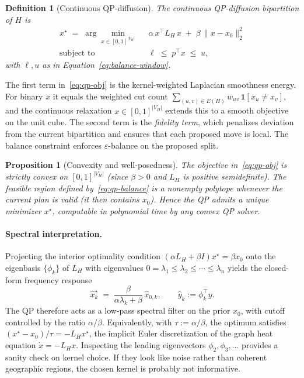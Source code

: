 \documentclass[11pt]{article}
\newtheorem{proposition}{Proposition}[section]
\newtheorem{definition}{Definition}[section]
\begin{document}
\begin{definition}[Continuous QP-diffusion]\label{def:qp}
The continuous QP-diffusion bipartition of $H$ is
\begin{align}
  x^\star \;=\; \arg\min_{x \in [0,1]^{|V_H|}} \;\;
    & \alpha\, x^\top L_H\, x \;+\; \beta\, \|x - x_0\|_2^2 \label{eq:qp-obj} \\
  \text{subject to} \;\;
    & \ell \;\le\; p^\top x \;\le\; u,
    \label{eq:qp-balance}
\end{align}
with $\ell, u$ as in Equation~\eqref{eq:balance-window}.
\end{definition}

The first term in~\eqref{eq:qp-obj} is the kernel-weighted Laplacian
smoothness energy. For binary $x$ it equals the weighted cut count
$\sum_{(u,v) \in E(H)} w_{uv}\,\mathbf{1}[x_u \ne x_v]$, and the
continuous relaxation $x \in [0,1]^{|V_H|}$ extends this to a smooth
objective on the unit cube. The second term is the \emph{fidelity term},
which penalizes deviation from the current bipartition and ensures
that each proposed move is local. The balance constraint enforces
$\varepsilon$-balance on the proposed split.

\begin{proposition}[Convexity and well-posedness]\label{prop:convex}
The objective in~\eqref{eq:qp-obj} is strictly convex on
$[0,1]^{|V_H|}$ (since $\beta > 0$ and $L_H$ is positive semidefinite).
The feasible region defined by~\eqref{eq:qp-balance} is a nonempty
polytope whenever the current plan is valid (it then contains $x_0$).
Hence the QP admits a unique minimizer $x^\star$, computable in
polynomial time by any convex QP solver.
\end{proposition}

\paragraph{Spectral interpretation.} Projecting the interior optimality
condition $(\alpha L_H + \beta I) x^\star = \beta x_0$ onto the
eigenbasis $\{\phi_k\}$ of $L_H$ with eigenvalues
$0 = \lambda_1 \le \lambda_2 \le \cdots \le \lambda_n$ yields the
closed-form frequency response
\begin{equation}\label{eq:freq-response}
  \hat x^\star_k \;=\; \frac{\beta}{\alpha \lambda_k + \beta}\,
  \hat x_{0,k},
  \qquad \hat y_k := \phi_k^\top y.
\end{equation}
The QP therefore acts as a low-pass spectral filter on the prior $x_0$,
with cutoff controlled by the ratio $\alpha / \beta$. Equivalently, with
$\tau := \alpha / \beta$, the optimum satisfies
$(x^\star - x_0)/\tau = -L_H x^\star$, the implicit Euler
discretization of the graph heat equation $\dot x = -L_H x$. Inspecting
the leading eigenvectors $\phi_2, \phi_3, \ldots$ provides a sanity
check on kernel choice. If they look like noise rather than coherent
geographic regions, the chosen kernel is probably not informative.
\end{document}
